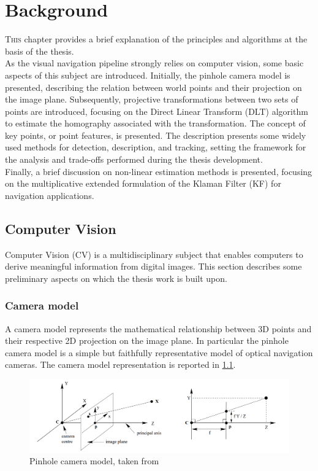 \chapter{Background}
\lettrine{T}{his} chapter provides a brief explanation of the principles and algorithms at the basis of the thesis. \\As the visual navigation pipeline strongly relies on computer vision, some basic aspects of this subject are introduced. Initially, the pinhole camera model is presented, describing the relation between world points and their projection on the image plane. Subsequently, projective transformations between two sets of points are introduced, focusing on the Direct Linear Transform (DLT) algorithm to estimate the homography associated with the transformation. The concept of key points, or point features, is presented. The description presents some widely used methods for detection, description, and tracking, setting the framework for the analysis and trade-offs performed during the thesis development. \\
Finally, a brief discussion on non-linear estimation methods is presented, focusing on the multiplicative extended formulation of the Klaman Filter (KF) for navigation applications. 


\section{Computer Vision}
Computer Vision (CV) is a multidisciplinary subject that enables computers to derive meaningful information from digital images. This section describes some preliminary aspects on which the thesis work is built upon.
\subsection{Camera model}
\label{sec:cameramodel}
A camera model represents the mathematical relationship between 3D points and their respective 2D projection on the image plane. In particular the pinhole camera model is a simple but faithfully representative model of optical navigation cameras. The camera model representation is reported in \cref{fig:pinholemodel}.

\begin{figure}[!ht]
    \centering
    \includegraphics[width = \linewidth]{Images/pinholemodel.PNG}
    \caption{Pinhole camera model, taken from \cite{hartley2003multiple}}
    \label{fig:pinholemodel}
\end{figure}

